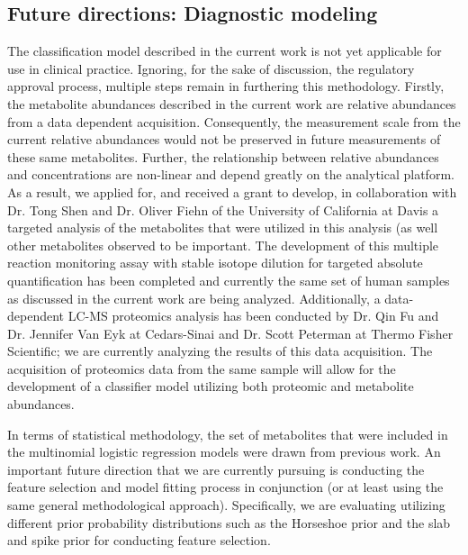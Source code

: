 \begin{DoubleSpace*}
\section{Future directions: Diagnostic modeling}
The classification model described in the current work is not yet applicable for use in clinical practice. Ignoring, for the sake of discussion, the regulatory approval process, multiple steps remain in furthering this methodology. Firstly, the metabolite abundances described in the current work are relative abundances from a data dependent acquisition. Consequently, the measurement scale from the current relative abundances would not be preserved in future measurements of these same metabolites. Further, the relationship between relative abundances and concentrations are non-linear and depend greatly on the analytical platform. As a result, we applied for, and received a grant to develop, in collaboration with Dr. Tong Shen and Dr. Oliver Fiehn of the University of California at Davis a targeted analysis of the metabolites that were utilized in this analysis (as well other metabolites observed to be important. The development of this multiple reaction monitoring assay with stable isotope dilution for targeted absolute quantification has been completed and currently the same set of human samples as discussed in the current work are being analyzed. Additionally, a data-dependent LC-MS proteomics analysis has been conducted by Dr. Qin Fu and Dr. Jennifer Van Eyk at Cedars-Sinai and Dr. Scott Peterman at Thermo Fisher Scientific; we are currently analyzing the results of this data acquisition.  The acquisition of proteomics data from the same sample will allow for the development of a classifier model utilizing both proteomic and metabolite abundances. 

In terms of statistical methodology, the set of metabolites that were included in the multinomial logistic regression models were drawn from previous work. An important future direction that we are currently pursuing is conducting the feature selection and model fitting process in conjunction (or at least using the same general methodological approach). Specifically, we are evaluating utilizing different prior probability distributions such as the Horseshoe prior and the slab and spike prior for conducting feature selection. 


\end{DoubleSpace*}

